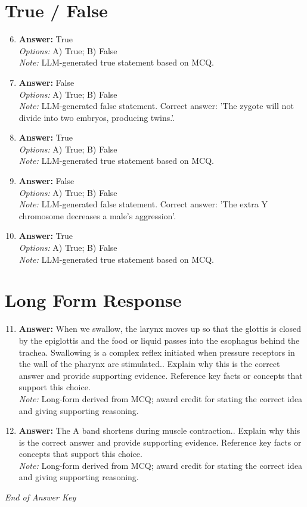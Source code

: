 \documentclass[12pt]{article}
\begin{document}
\section*{True / False}
\begin{enumerate}[label=\arabic*.]
\setcounter{enumi}{5}
\item \textbf{Answer:} True
\\ \textit{Options:} A) True; B) False
\\ \textit{Note:} LLM-generated true statement based on MCQ.
\item \textbf{Answer:} False
\\ \textit{Options:} A) True; B) False
\\ \textit{Note:} LLM-generated false statement. Correct answer: 'The zygote will not divide into two embryos, producing twins.'.
\item \textbf{Answer:} True
\\ \textit{Options:} A) True; B) False
\\ \textit{Note:} LLM-generated true statement based on MCQ.
\item \textbf{Answer:} False
\\ \textit{Options:} A) True; B) False
\\ \textit{Note:} LLM-generated false statement. Correct answer: 'The extra Y chromosome decreases a male's aggression'.
\item \textbf{Answer:} True
\\ \textit{Options:} A) True; B) False
\\ \textit{Note:} LLM-generated true statement based on MCQ.
\end{enumerate}

\section*{Long Form Response}
\begin{enumerate}[label=\arabic*.]
\setcounter{enumi}{10}
\item \textbf{Answer:} When we swallow, the larynx moves up so that the glottis is closed by the epiglottis and
the food or liquid passes into the esophagus behind the trachea. Swallowing is a complex
reflex initiated when pressure receptors in the wall of the pharynx are stimulated..
Explain why this is the correct answer and provide supporting evidence. Reference key
facts or concepts that support this choice.
\\ \textit{Note:} Long-form derived from MCQ; award credit for stating the correct idea and giving supporting reasoning.
\item \textbf{Answer:} The A band shortens during muscle contraction.. Explain why this is the correct answer and
provide supporting evidence. Reference key facts or concepts that support this choice.
\\ \textit{Note:} Long-form derived from MCQ; award credit for stating the correct idea and giving supporting reasoning.
\end{enumerate}

\vfill
\noindent\textit{End of Answer Key}
\end{document}

